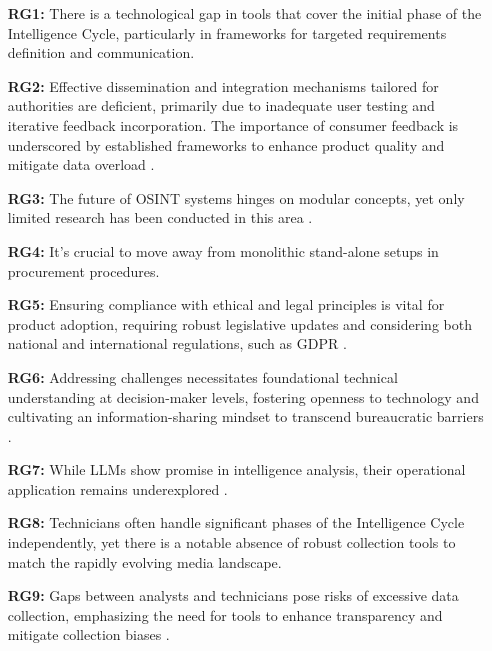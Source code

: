 \documentclass[10pt]{article}
\begin{document}
\begin{itemize}
    \item[\textbf{RG1:}] There is a technological gap in tools that cover the initial phase of the Intelligence Cycle, particularly in frameworks for targeted requirements definition and communication.

        \item[\textbf{RG2:}]Effective dissemination and integration mechanisms tailored for authorities are deficient, primarily due to inadequate user testing and iterative feedback incorporation. The importance of consumer feedback is underscored by established frameworks to enhance product quality and mitigate data overload \cite{JointChiefsofStaffU.S.Army.2013, NorthAtlanticTreatyOrganization.2001}.

    \item[\textbf{RG3:}] The future of OSINT systems hinges on modular concepts, yet only limited research has been conducted in this area \cite{Arjun.2020,Wright.2020}.

    \item[\textbf{RG4:}] It's crucial to move away from monolithic stand-alone setups in procurement procedures.

    \item[\textbf{RG5:}] Ensuring compliance with ethical and legal principles is vital for product adoption, requiring robust legislative updates and considering both national and international regulations, such as GDPR \cite{EuropeanParliament.2016,EuropeanCommission.18.08.2023,Wittmer.2022}.

    \item[\textbf{RG6:}] Addressing challenges necessitates foundational technical understanding at decision-maker levels, fostering openness to technology and cultivating an information-sharing mindset to transcend bureaucratic barriers \cite{NorthAtlanticTreatyOrganization.2001}.

    \item[\textbf{RG7:}] While LLMs show promise in intelligence analysis, their operational application remains underexplored \cite{Radford.2023,Zhao.31.03.2023}.

    \item[\textbf{RG8:}] Technicians often handle significant phases of the Intelligence Cycle independently, yet there is a notable absence of robust collection tools to match the rapidly evolving media landscape.

    \item[\textbf{RG9:}] Gaps between analysts and technicians pose risks of excessive data collection, emphasizing the need for tools to enhance transparency and mitigate collection biases \cite{Lowenthal.2020}.
\end{itemize}
\end{document}
